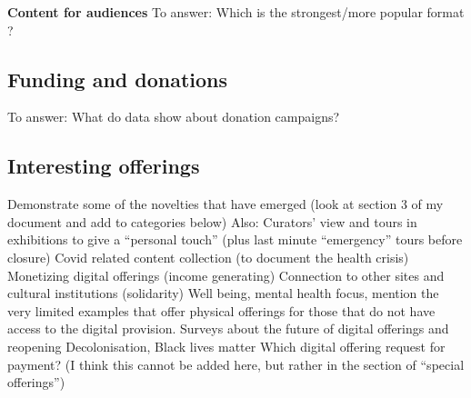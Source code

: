 \documentclass{egpubl}
\begin{document}

\noindent \textbf{Content for audiences}
\color{red}To answer: Which is the strongest/more popular format ?\color{black}




\subsection{Funding and donations}
\color{red}To answer: What do data show about donation campaigns?\color{black}



\subsection{Interesting offerings }
Demonstrate some of the novelties that have emerged (look at section 3 of my document and add to categories below)
Also: 
Curators’ view and tours in exhibitions to give a “personal touch” (plus last minute “emergency” tours before closure)
Covid related content collection (to document the health crisis)
Monetizing digital offerings (income generating)
Connection to other sites and cultural institutions (solidarity)
Well being, mental health focus, mention the very limited examples that offer physical offerings for those  that do not have access to the digital provision.
Surveys about the future of digital offerings and reopening
Decolonisation, Black lives matter
Which digital offering request for payment? (I think this cannot be added here, but rather in the section of “special offerings”)
\end{document}
